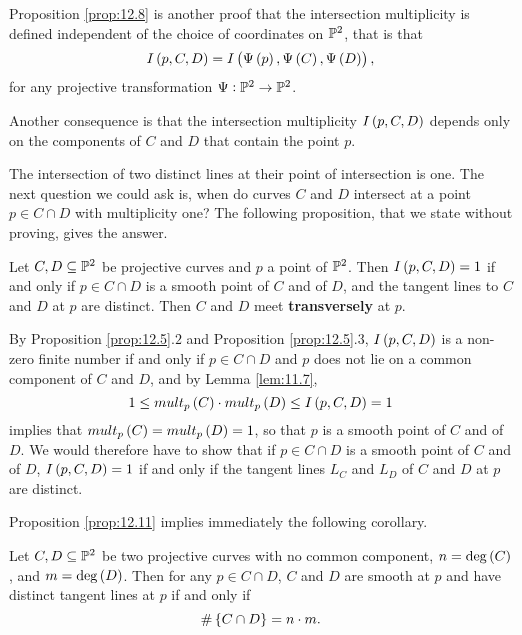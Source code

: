 \begin{remark}
\label{rem:12.9}
Proposition \ref{prop:12.8} is another proof that the intersection multiplicity is defined independent of the choice of coordinates on $ \P^2 $, that is that
$$ I\br{p, C, D} = I\br{\Psi\br{p}, \Psi\br{C}, \Psi\br{D}}, $$
for any projective transformation $ \Psi : \P^2 \to \P^2 $.
\end{remark}

\begin{remark}
Another consequence is that the intersection multiplicity $ I\br{p, C, D} $ depends only on the components of $ C $ and $ D $ that contain the point $ p $.
\end{remark}

The intersection of two distinct lines at their point of intersection is one. The next question we could ask is, when do curves $ C $ and $ D $ intersect at a point $ p \in C \cap D $ with multiplicity one? The following proposition, that we state without proving, gives the answer.

\begin{proposition}
\label{prop:12.11}
Let $ C, D \subseteq \P^2 $ be projective curves and $ p $ a point of $ \P^2 $. Then $ I\br{p, C, D} = 1 $ if and only if $ p \in C \cap D $ is a smooth point of $ C $ and of $ D $, and the tangent lines to $ C $ and $ D $ at $ p $ are distinct. Then $ C $ and $ D $ meet \textbf{transversely} at $ p $.
\end{proposition}

\begin{remark}
By Proposition \ref{prop:12.5}.$ 2 $ and Proposition \ref{prop:12.5}.$ 3 $, $ I\br{p, C, D} $ is a non-zero finite number if and only if $ p \in C \cap D $ and $ p $ does not lie on a common component of $ C $ and $ D $, and by Lemma \ref{lem:11.7},
$$ 1 \le mult_p\br{C} \cdot mult_p\br{D} \le I\br{p, C, D} = 1 $$
implies that $ mult_p\br{C} = mult_p\br{D} = 1 $, so that $ p $ is a smooth point of $ C $ and of $ D $. We would therefore have to show that if $ p \in C \cap D $ is a smooth point of $ C $ and of $ D $, $ I\br{p, C, D} = 1 $ if and only if the tangent lines $ L_C $ and $ L_D $ of $ C $ and $ D $ at $ p $ are distinct.
\end{remark}

Proposition \ref{prop:12.11} implies immediately the following corollary.

\begin{corollary}
Let $ C, D \subseteq \P^2 $ be two projective curves with no common component, $ n = \deg\br{C} $, and $ m = \deg\br{D} $. Then for any $ p \in C \cap D $, $ C $ and $ D $ are smooth at $ p $ and have distinct tangent lines at $ p $ if and only if
$$ \#\cbr{C \cap D} = n \cdot m. $$
\end{corollary}

